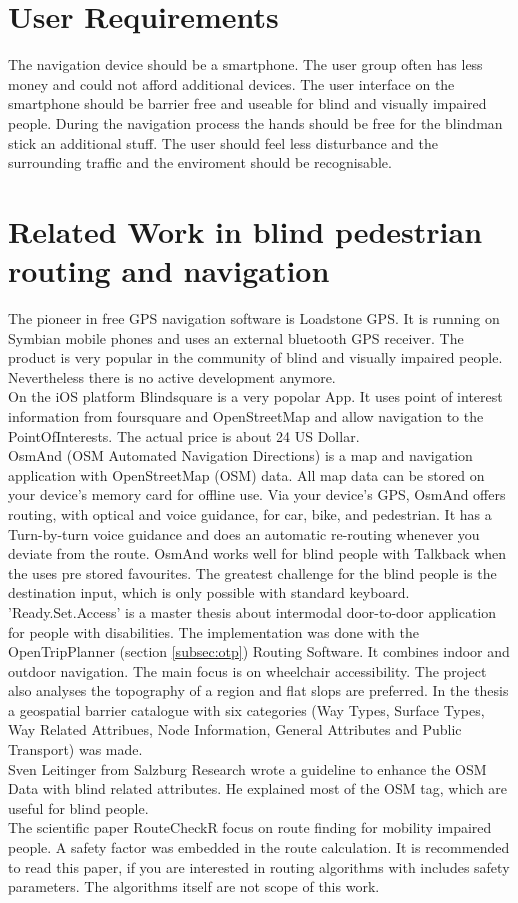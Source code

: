 \documentclass{sig-alternate}
\begin{document}
\section{User Requirements}
The navigation device should be a smartphone. The user group often has less money and could not afford additional devices. The user interface on the smartphone should be barrier free and useable for blind and visually impaired people. During the navigation process the hands should be free for the blindman stick an additional stuff. The user should feel less disturbance and the surrounding traffic and the enviroment should be recognisable.  

\section{Related Work in blind pedestrian routing and navigation}
The pioneer in free GPS navigation software is Loadstone GPS\cite{loadstone}. It is running on Symbian mobile phones and uses an external bluetooth GPS receiver. The product is very popular in the community of blind and visually impaired people. Nevertheless there is no active development anymore. \\
On the iOS platform Blindsquare\cite{blindsquare} is a very popolar App. It uses point of interest information from foursquare and OpenStreetMap and allow navigation to the PointOfInterests. The actual price is about 24 US Dollar. \\
OsmAnd (OSM Automated Navigation Directions) is a map and navigation application with OpenStreetMap (OSM) data. All map data can be stored on your device's memory card for offline use. Via your device's GPS, OsmAnd offers routing, with optical and voice guidance, for car, bike, and pedestrian. It has a Turn-by-turn voice guidance and does an automatic re-routing whenever you deviate from the route. OsmAnd works well for blind people with Talkback when the uses pre stored favourites. The greatest challenge for the blind people is the destination input, which is only possible with standard keyboard.  \\
'Ready.Set.Access'\cite{weyrer} is a master thesis about intermodal door-to-door application for people with disabilities. The implementation was done with the OpenTripPlanner (section \ref{subsec:otp}) Routing Software. It combines indoor and outdoor navigation. The main focus is on wheelchair accessibility. The project also analyses the topography of a region and flat slops are preferred. In the thesis a geospatial barrier catalogue with six categories (Way Types, Surface Types, Way Related Attribues, Node Information, General Attributes and Public Transport) was made. \\
Sven Leitinger\cite{sven:osm} from Salzburg Research wrote a guideline to enhance the OSM Data with blind related attributes. He explained most of the OSM tag, which are useful for blind people. \\
The scientific paper\cite{Volkel:2008} RouteCheckR focus on route finding for mobility impaired people. A safety factor was embedded in the route calculation. It is recommended to read this paper, if you are interested in routing algorithms with includes safety parameters. The algorithms itself are not scope of this work.  
\end{document}

